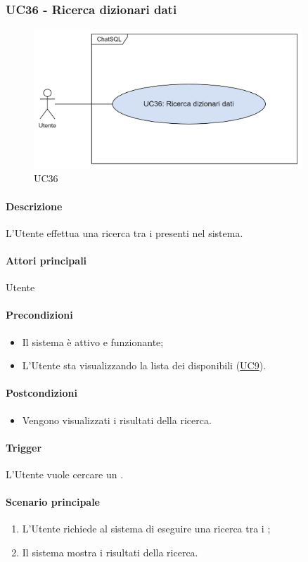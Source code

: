 \subsubsection{UC36 - Ricerca dizionari dati}\label{UC36}

\begin{figure}[H]
  \centering
  \includegraphics[width=0.90\textwidth]{assets/uc36.png}
  \caption{UC36}
\end{figure}

\paragraph*{Descrizione}
L'Utente effettua una ricerca tra i  presenti nel sistema.

\paragraph*{Attori principali}
Utente

\paragraph*{Precondizioni}
\begin{itemize}
  \item Il sistema è attivo e funzionante;
  \item L'Utente sta visualizzando la lista dei  disponibili (\hyperref[UC9]{UC9}).
\end{itemize}

\paragraph*{Postcondizioni}
\begin{itemize}
  \item Vengono visualizzati i risultati della ricerca.
\end{itemize}

\paragraph*{Trigger}
L'Utente vuole cercare un .

\paragraph*{Scenario principale}
\begin{enumerate}
  \item L'Utente richiede al sistema di eseguire una ricerca tra i ;
  \item Il sistema mostra i risultati della ricerca.
\end{enumerate}
